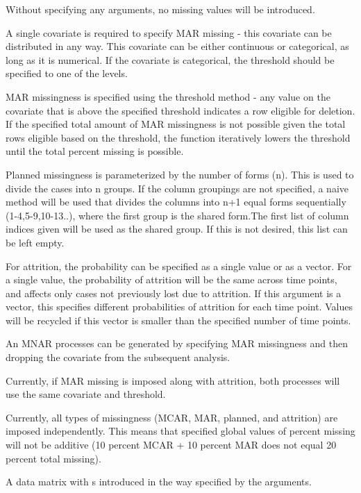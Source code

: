 \documentclass[a4paper]{book}
\begin{document}
\begin{Details}\relax
Without specifying any arguments, no missing values will be
introduced.

A single covariate is required to specify MAR missing - this
covariate can be distributed in any way. This covariate can be either continuous or categorical, as long as it is
numerical. If the covariate is categorical, the threshold should be
specified to one of the levels.

MAR missingness is specified using the threshold method - any value on the covariate that is above
the specified threshold indicates a row eligible for deletion. If the
specified total amount of MAR missingness is not possible given the
total rows eligible based on the threshold, the function iteratively
lowers the threshold until the total percent missing is possible.

Planned missingness is parameterized by the number of forms (n). This is used to divide the
cases into n groups. If the column groupings are not specified, a naive
method will be used that divides the columns into n+1 equal forms
sequentially (1-4,5-9,10-13..), where the first group is the shared
form.The first list of column indices given will be used as the shared
group. If this is not desired, this list can be left empty.

For attrition, the probability can be specified as a single value or as
a vector. For a single value, the probability of attrition will be
the same across time points, and affects only
cases not previously lost due to attrition. If this argument is a
vector, this specifies different probabilities of
attrition for each time point. Values will be recycled if this
vector is smaller than the specified number of time points.

An MNAR processes can be generated by specifying MAR missingness and then
dropping the covariate from the subsequent analysis.

Currently, if MAR missing is imposed along with attrition, both processes will use
the same covariate and threshold.

Currently, all types of missingness (MCAR, MAR, planned, and attrition)
are imposed independently. This means that specified global values of
percent missing will not be additive (10 percent MCAR + 10 percent MAR
does not equal 20 percent total missing). 
\end{Details}
%
\begin{Value}
A data matrix with s introduced in the way specified by the arguments.
\end{Value}
\end{document}
